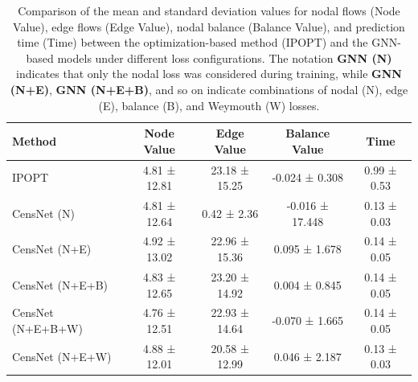 %



\begin{table}[htbp]
\centering
\begin{tabular}{|l|c|c|c|c|}
    \hline
    Method & Node Value & Edge Value & Balance Value & Time \\ \hline
    IPOPT & 4.81 ± 12.81 & 23.18 ± 15.25 & -0.024 ± 0.308 & 0.99 ± 0.53 \\ \hline
    CensNet (N) & 4.81 ± 12.64 & 0.42 ± 2.36 & -0.016 ± 17.448 & 0.13 ± 0.03 \\ \hline
    CensNet (N+E) & 4.92 ± 13.02 & 22.96 ± 15.36 & 0.095 ± 1.678 & 0.14 ± 0.05 \\ \hline
    CensNet (N+E+B) & 4.83 ± 12.65 & 23.20 ± 14.92 & 0.004 ± 0.845 & 0.14 ± 0.05 \\ \hline
    CensNet (N+E+B+W) & 4.76 ± 12.51 & 22.93 ± 14.64 & -0.070 ± 1.665 & 0.14 ± 0.05 \\ \hline
    CensNet (N+E+W) & 4.88 ± 12.01 & 20.58 ± 12.99 & 0.046 ± 2.187 & 0.13 ± 0.03 \\ \hline
\end{tabular}
\caption{Comparison of the mean and standard deviation values for nodal flows (Node Value), edge flows (Edge Value), nodal balance (Balance Value), and prediction time (Time) between the optimization-based method (IPOPT) and the GNN-based models under different loss configurations. The notation \textbf{GNN (N)} indicates that only the nodal loss was considered during training, while \textbf{GNN (N+E)}, \textbf{GNN (N+E+B)}, and so on indicate combinations of nodal (N), edge (E), balance (B), and Weymouth (W) losses.}
\label{tab:base_nl_dummy_results_simplified}
\end{table}
 



